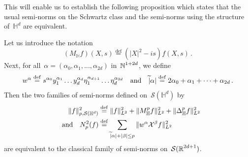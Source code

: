 \documentclass[AHL,Unicode,longabstracts]{cedram}
\let\wt=\widetilde
\def\N{\mathop{\mathbb N\kern 0pt}\nolimits}
\def\R{{\mathop{\mathbb R\kern 0pt}\nolimits}}
\newcommand*\bbH{\mathbb{H}}
\newcommand{\D}{\Delta}
\newcommand{\wt}{\widetilde}
\newcommand*\cS{\mathcal{S}}
\newcommand*\cX{\mathcal{X}}
\newcommand*\N{\mathbb{N}}
\newcommand*\R{\mathbb{R}}
\newcommand*\bbH{\mathbb{H}}
\newcommand{\andf}{\quad\hbox{and}\quad}
\newcommand*\eqdefa{\overset{\mathrm{def}}{=}}
\begin{document}
This will enable us to establish the following proposition which states that the usual semi-norms on the Schwartz class and the semi-norms using the structure of~$\bbH^d$ are equivalent.

\begin{prop}\label{p:schwartz}
Let us introduce the notation
\[
(M_\bbH f) (X,s) \eqdefa (|X|^2- is) f(X,s)\,.
\]
Next, for all~$\alpha =(\alpha_0, \alpha_1, \dots, \alpha_{2d})$ in~$\N^{1+2d}$, we define
\[
w^\alpha \eqdefa s^{\alpha_0} y_1^{\alpha_1} \dots y_d^{\alpha_d} \eta_1^{\alpha_{d+1}} \dots \eta_d^{\alpha_{2d}}
\andf \wt |\alpha|\eqdefa 2\alpha_0+\alpha_1+\dots +\alpha_{2d}\,.
\]
Then the two families of semi-norms defined on~$\cS(\bbH^d)$ by
\[
\begin{aligned}
\|f\|^2_{p,\cS(\bbH^d)} & \eqdefa \|f\|_{L^2} ^2+ \|M_\bbH^pf\|_{L^2}^2 +\| \D_\bbH^p f \|^2_{L^2} \\ \andf
N_p^2(f) & \eqdefa \sum_{\wt |\alpha|+|\beta| \leq p }\| w^\alpha \cX^\beta f\|^2_{L^2}
\end{aligned}
\]
are equivalent to the classical family of semi-norms on~$\cS(\R^{2d+1})$.
\end{prop}
\end{document}
